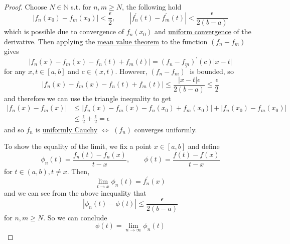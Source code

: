   \begin{proof}
    Choose $N \in \mathbb{N}$ s.t. for $n, m \geq N$, the following hold 
    \begin{equation}
      |f_n (x_0) - f_m (x_0)| < \frac{\epsilon}{2}, \qquad |f_n^\prime (t) - f_m^\prime (t)| < \frac{\epsilon}{2 (b - a)}
    \end{equation}
    which is possible due to convergence of $f_n (x_0)$ and \hyperref[def:uniform-convergence]{uniform convergence} of the derivative. Then applying the \hyperref[thm:mvt]{mean value theorem} to the function $(f_n - f_m)$ gives 
    \begin{equation}
      |f_n (x) - f_m (x) - f_n (t) + f_m (t)| = (f_n - f_m)^\prime (c) |x - t| 
    \end{equation}
    for any $x, t \in [a, b]$ and $c \in (x, t)$. However, $(f_n - f_m)^\prime$ is bounded, so 
    \begin{equation}
      |f_n (x) - f_m (x) - f_n (t) + f_m (t)| \leq \frac{|x - t| \epsilon}{2 (b - a)} \leq \frac{\epsilon}{2}
    \end{equation}
    and therefore we can use the triangle inequality to get 
    \begin{align}
      |f_n (x) - f_m (x)| & \leq |f_n (x) - f_m (x) - f_n (x_0) + f_m (x_0)| + | f_n (x_0) - f_m (x_0)| \\
                          & \leq \frac{\epsilon}{2} + \frac{\epsilon}{2} = \epsilon
    \end{align}
    and so $f_n$ is \hyperref[def:uniformly-cauchy]{uniformly Cauchy} $\iff$ $(f_n)$ converges uniformly. 

    To show the equality of the limit, we fix a point $x \in [a, b]$ and define 
    \begin{equation}
      \phi_n (t) = \frac{f_n (t) - f_n (x)}{t - x}, \qquad \phi(t) = \frac{f(t) - f(x)}{t - x} 
    \end{equation}
    for $t \in (a, b), t \neq x$. Then, 
    \begin{equation}
      \lim_{t \to x} \phi_n (t) = f_n^\prime (x) 
    \end{equation}
    and we can see from the above inequality that 
    \begin{equation}
      | \phi_n (t) - \phi(t) | \leq \frac{\epsilon}{2 (b - a)}
    \end{equation}
    for $n, m \geq N$. So we can conclude 
    \begin{equation}
      \phi(t) = \lim_{n \to \infty} \phi_n (t)
    \end{equation}
  \end{proof}
